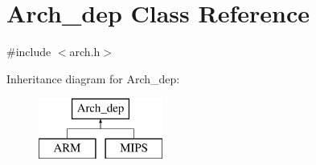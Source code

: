 \hypertarget{classArch__dep}{}\section{Arch\+\_\+dep Class Reference}
\label{classArch__dep}


{\ttfamily \#include $<$arch.\+h$>$}

Inheritance diagram for Arch\+\_\+dep\+:\begin{figure}[H]
\begin{center}
\leavevmode
\includegraphics[height=2.000000cm]{classArch__dep}
\end{center}
\end{figure}
